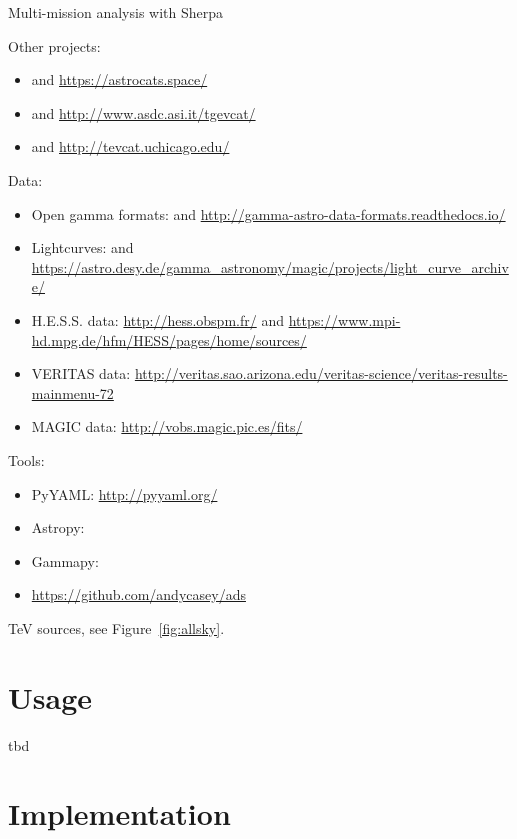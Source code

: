 \documentclass[11pt,twoside]{article}
\begin{document}
Multi-mission analysis with Sherpa \citep{sherpa}

Other projects:

\begin{itemize}
\item \citet{sne-cat} and \url{https://astrocats.space/}
\item \citet{tgevcat} and \url{http://www.asdc.asi.it/tgevcat/}
\item \citet{tevcat} and \url{http://tevcat.uchicago.edu/}
\end{itemize}

Data:

\begin{itemize}
\item Open gamma formats: \citet{open-gamma} and \url{http://gamma-astro-data-formats.readthedocs.io/}
\item Lightcurves: \citet{lc} and \url{https://astro.desy.de/gamma_astronomy/magic/projects/light_curve_archive/}
\item H.E.S.S. data: \url{http://hess.obspm.fr/} and \url{https://www.mpi-hd.mpg.de/hfm/HESS/pages/home/sources/}
\item VERITAS data: \url{http://veritas.sao.arizona.edu/veritas-science/veritas-results-mainmenu-72}
\item MAGIC data: \url{http://vobs.magic.pic.es/fits/}
\end{itemize}

Tools:

\begin{itemize}
\item PyYAML: \url{http://pyyaml.org/}
\item Astropy: \citet{astropy}
\item Gammapy: \citet{gammapy}
\item \url{https://github.com/andycasey/ads}
\end{itemize}

TeV sources, see Figure~\ref{fig:allsky}.



\section{Usage}

tbd

\section{Implementation}
\end{document}
